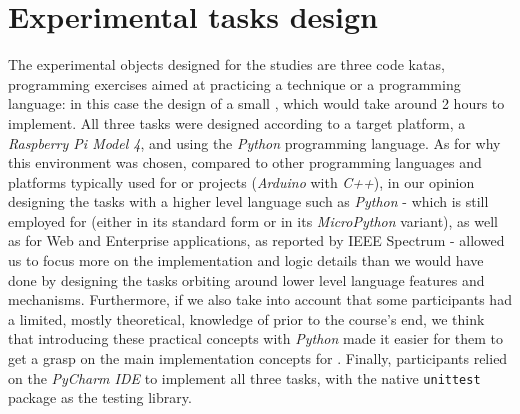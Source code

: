 \section{Experimental tasks design}
The experimental objects designed for the studies are three code katas, \ie programming exercises aimed at practicing a technique or a programming language: in this case the design of a small \es, which would take around 2 hours to implement. 
All three tasks were designed according to a target platform, a \textit{Raspberry Pi Model 4}, and using the \textit{Python} programming language. As for why this environment was chosen, compared to other programming languages and platforms typically used for \ess or \iot projects (\eg \textit{Arduino} with \textit{C++}), in our opinion designing the tasks with a higher level language such as \textit{Python} - which is still employed for \ess (either in its standard form or in its \textit{MicroPython} variant), as well as for Web and Enterprise applications, as reported by IEEE Spectrum \cite{IEEESpectrum} - allowed us to focus more on the implementation and logic details than we would have done by designing the tasks orbiting around lower level language features and mechanisms.
Furthermore, if we also take into account that some participants had a limited, mostly theoretical, knowledge of \ess prior to the course's end, we think that introducing these practical concepts with \textit{Python} made it easier for them to get a grasp on the main implementation concepts for \ess. Finally, participants relied on the \textit{PyCharm IDE} to implement all three tasks, with the native \texttt{unittest} package as the testing library.

